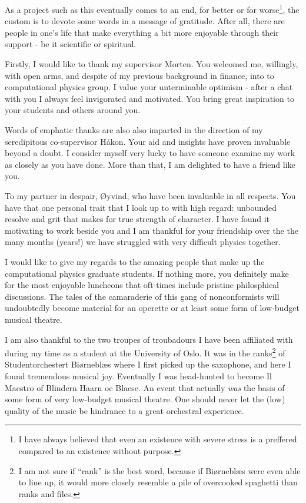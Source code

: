 As a project such as this eventually comes to an end, for better or for
worse\footnote{I have always believed that even an existence with severe stress is a preffered
compared to an existence without purpose.},
the custom is to devote some words in a message of gratitude. After all, 
there are people in one's life that make everything a bit more enjoyable through their
support - be it scientific or spiritual.

Firstly, I would like to thank my supervisor Morten. You welcomed me, willingly, with open arms,
and despite of my previous background in finance, into to computational physics group. I value your 
unterminable optimism - after a chat with you I always feel invigorated and motivated. You bring 
great inspiration to your students and others around you.

Words of emphatic thanks are also also imparted in the direction of my seredipitous co-supervisor Håkon.
Your aid and insights have proven invaluable beyond a doubt. I consider myself very lucky to have
someone examine my 
work as closely as you have done. More than that, I am delighted to have a friend like you.

To my partner in despair, Øyvind, who have been invaluable in all respects. You have that one personal 
trait that I look up to with high regard: unbounded resolve and grit that makes for true
strength of character. I have found it motivating to work beside you and I am thankful for your 
friendship over the the many months (years!) we have struggled with very difficult physics together.

I would like to give my regards to the amazing people that make up the computational physics graduate
students.
If nothing more, you definitely make for the most enjoyable luncheons that oft-times include
pristine
philosphical discussions. The tales of the camaraderie of this gang of nonconformists will 
undoubtedly become material for an operette or at least some form of low-budget musical theatre.

I am also thankful to the two troupes of troubadours I have been affiliated with during my time as a student 
at the University of Oslo. It was in the ranks\footnote{I am not sure if ``rank'' is the best word, because 
if Biørneblæs were even able to line up, it would more closely resemble a pile of overcooked spaghetti
than ranks and files.} of Studentorchestert Biørneblæs where I first 
picked up the saxophone, and here I found tremendous musical joy. Eventually I was head-hunted to 
become Il Maestro of Blindern Haarn oc Blaese. An event that actually \emph{was}
the basis of some form of very low-budget musical theatre. One should never let the (low) quality
of the music be hindrance to a great orchestral experience.

